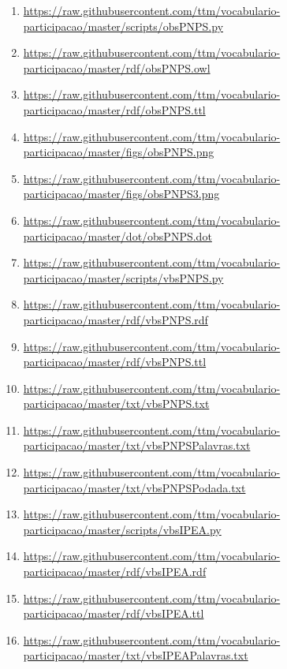 \documentclass[12pt]{article}
\begin{document}
{\begin{enumerate}
 \item \url{https://raw.githubusercontent.com/ttm/vocabulario-participacao/master/scripts/obsPNPS.py} \label{i:70}
    \item  \url{https://raw.githubusercontent.com/ttm/vocabulario-participacao/master/rdf/obsPNPS.owl}\label{i:71}
    \item  \url{https://raw.githubusercontent.com/ttm/vocabulario-participacao/master/rdf/obsPNPS.ttl}\label{i:72}
    \item \url{https://raw.githubusercontent.com/ttm/vocabulario-participacao/master/figs/obsPNPS.png}\label{i:73}
    \item \url{https://raw.githubusercontent.com/ttm/vocabulario-participacao/master/figs/obsPNPS3.png}\label{i:75}
    \item  \url{https://raw.githubusercontent.com/ttm/vocabulario-participacao/master/dot/obsPNPS.dot}\label{i:76}

\item \url{https://raw.githubusercontent.com/ttm/vocabulario-participacao/master/scripts/vbsPNPS.py}         \label{i:77}
    \item \url{https://raw.githubusercontent.com/ttm/vocabulario-participacao/master/rdf/vbsPNPS.rdf}        \label{i:78}
    \item \url{https://raw.githubusercontent.com/ttm/vocabulario-participacao/master/rdf/vbsPNPS.ttl}        \label{i:79}
    \item \url{https://raw.githubusercontent.com/ttm/vocabulario-participacao/master/txt/vbsPNPS.txt}        \label{i:80}
    \item \url{https://raw.githubusercontent.com/ttm/vocabulario-participacao/master/txt/vbsPNPSPalavras.txt}\label{i:81}
    \item \url{https://raw.githubusercontent.com/ttm/vocabulario-participacao/master/txt/vbsPNPSPodada.txt}  \label{i:82}

\item \url{https://raw.githubusercontent.com/ttm/vocabulario-participacao/master/scripts/vbsIPEA.py}         \label{i:83}
    \item \url{https://raw.githubusercontent.com/ttm/vocabulario-participacao/master/rdf/vbsIPEA.rdf}        \label{i:84}
    \item \url{https://raw.githubusercontent.com/ttm/vocabulario-participacao/master/rdf/vbsIPEA.ttl}        \label{i:85}
    \item \url{https://raw.githubusercontent.com/ttm/vocabulario-participacao/master/txt/vbsIPEAPalavras.txt}\label{i:86}



\end{enumerate}
}
\end{document}
